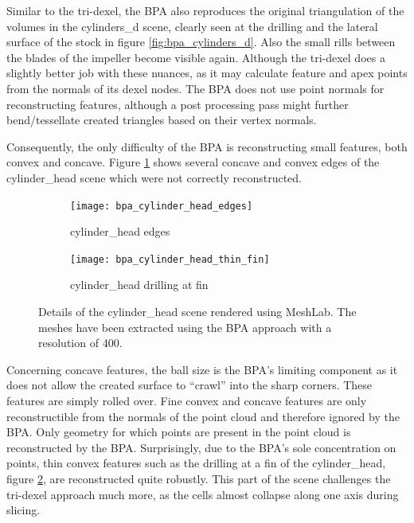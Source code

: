 Similar to the tri-dexel, the BPA also reproduces the original triangulation of the volumes in the cylinders\_d scene, clearly seen at the drilling and the lateral surface of the stock in figure \ref{fig:bpa_cylinders_d}.
Also the small rills between the blades of the impeller become visible again.
Although the tri-dexel does a slightly better job with these nuances, as it may calculate feature and apex points from the normals of its dexel nodes.
The BPA does not use point normals for reconstructing features, although a post processing pass might \eg further bend/tessellate created triangles based on their vertex normals.

Consequently, the only difficulty of the BPA is reconstructing small features, both convex and concave.
Figure \ref{fig:bpa_cylinder_head_edges} shows several concave and convex edges of the cylinder\_head scene which were not correctly reconstructed.
%
\begin{figure}
	\centering
	\begin{subfigure}[b]{0.49\textwidth}
		\centering
		\texttt{[image: bpa\_cylinder\_head\_edges]}
		\caption{cylinder\_head edges}
		\label{fig:bpa_cylinder_head_edges}
	\end{subfigure}
	\begin{subfigure}[b]{0.49\textwidth}
		\centering
		\texttt{[image: bpa\_cylinder\_head\_thin\_fin]}
		\caption{cylinder\_head drilling at fin}
		\label{fig:bpa_cylinder_head_thin_fin}
	\end{subfigure}
	\caption{
		Details of the cylinder\_head scene rendered using MeshLab.
		The meshes have been extracted using the BPA approach with a resolution of 400.
	}
	\label{fig:bpa_cylinder_head_details}
\end{figure}
%
Concerning concave features, the ball size is the BPA's limiting component as it does not allow the created surface to \enquote{crawl} into the sharp corners.
These features are simply rolled over.
Fine convex and concave features are only reconstructible from the normals of the point cloud and therefore ignored by the BPA.
Only geometry for which points are present in the point cloud is reconstructed by the BPA.
Surprisingly, due to the BPA's sole concentration on points, thin convex features such as the drilling at a fin of the cylinder\_head, \cf figure \ref{fig:bpa_cylinder_head_thin_fin}, are reconstructed quite robustly.
This part of the scene challenges the tri-dexel approach much more, as the cells almost collapse along one axis during slicing.

